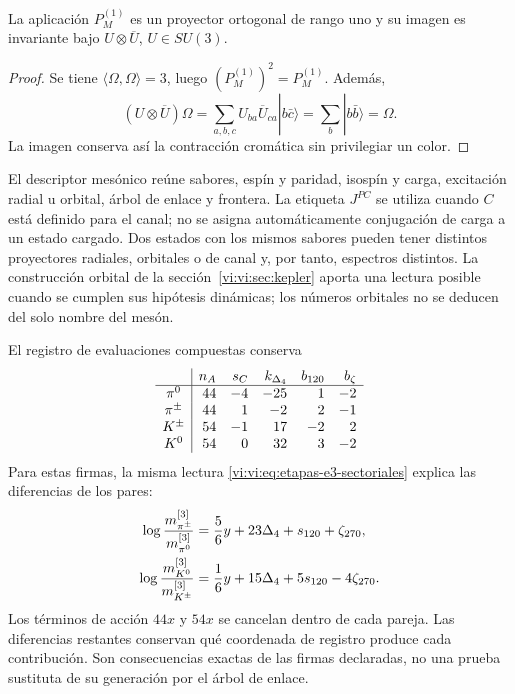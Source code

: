 \begin{proposition}
La aplicación \(P_M^{(1)}\) es un proyector ortogonal de rango uno y
su imagen es invariante bajo \(U\otimes\overline U\), \(U\in SU(3)\).
\end{proposition}
\begin{proof}
Se tiene \(\langle\Omega,\Omega\rangle=3\), luego
\((P_M^{(1)})^2=P_M^{(1)}\). Además,
\[
 (U\otimes\overline U)\Omega
 =\sum_{a,b,c}U_{ba}\overline U_{ca}|b\bar c\rangle
 =\sum_b|b\bar b\rangle=\Omega.
\]
La imagen conserva así la contracción cromática sin privilegiar un color.
\end{proof}

El descriptor mesónico reúne sabores, espín y paridad, isospín y carga,
excitación radial u orbital, árbol de enlace y frontera. La etiqueta
\(J^{PC}\) se utiliza cuando \(C\) está definido para el canal; no se
asigna automáticamente conjugación de carga a un estado cargado. Dos
estados con los mismos sabores pueden tener distintos proyectores
radiales, orbitales o de canal y, por tanto, espectros distintos. La
construcción orbital de la sección~\ref{vi:vi:sec:kepler} aporta una
lectura posible cuando se cumplen sus hipótesis dinámicas; los números
orbitales no se deducen del solo nombre del mesón.

El registro de evaluaciones compuestas conserva
\[
\begin{array}{c|r r r r r}
 &n_A&s_C&k_{\Delta_4}&b_{120}&b_\zeta\\\hline
 \pi^0&44&-4&-25&1&-2\\
 \pi^\pm&44&1&-2&2&-1\\
 K^\pm&54&-1&17&-2&2\\
 K^0&54&0&32&3&-2
\end{array}
\]
Para estas firmas, la misma lectura \eqref{vi:vi:eq:etapas-e3-sectoriales}
explica las diferencias de los pares:
\begin{align}
 \log\frac{m_{\pi^\pm}^{[3]}}{m_{\pi^0}^{[3]}}
 &=\frac56y+23\Delta_4+s_{120}+\zeta_{270},\notag\\
 \log\frac{m_{K^0}^{[3]}}{m_{K^\pm}^{[3]}}
 &=\frac16y+15\Delta_4+5s_{120}-4\zeta_{270}.
 \label{vi:vi:eq:desdoblamientos-mesonicos}
\end{align}
Los términos de acción \(44x\) y \(54x\) se cancelan dentro de
cada pareja. Las diferencias restantes conservan qué coordenada de
registro produce cada contribución. Son consecuencias exactas de las
firmas declaradas, no una prueba sustituta de su generación por el árbol
de enlace.

